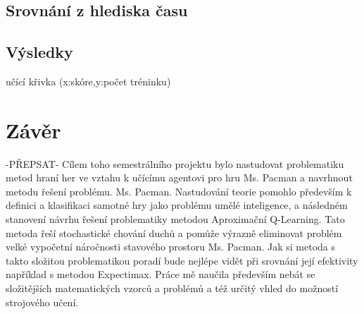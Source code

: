 \section{Srovnání z hlediska času}
\section{Výsledky}
učící křivka (x:skóre,y:počet tréninku)

\chapter{Závěr}
-PŘEPSAT-
Cílem toho semestrálního projektu bylo nastudovat problematiku metod hraní her ve vztahu k učícímu agentovi pro hru Ms. Pacman a navrhnout metodu řešení problému. Ms. Pacman. Nastudování teorie pomohlo především k definici a klasifikaci samotné hry jako problému umělé inteligence, a následném stanovení návrhu řešení problematiky metodou Aproximační Q-Learning. Tato metoda řeší stochastické chování duchů a pomůže výrazně eliminovat problém velké vypočetní náročnosti stavového prostoru Ms. Pacman. Jak si metoda s takto složitou problematikou poradí bude nejlépe vidět při srovnání její efektivity například s metodou Expectimax. Práce mě naučila především nebát se složitějších matematických vzorců a problémů a též určitý vhled do možností strojového učení.

